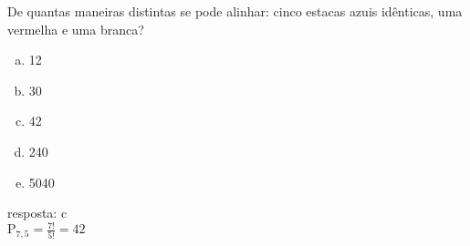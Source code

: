\begin{ex}
 De quantas maneiras distintas se pode alinhar: cinco estacas azuis idênticas, uma vermelha e uma branca?
    \begin{enumerate}[(a)]
    \item 12
    \item 30
    \item 42
    \item 240
    \item 5040
    \end{enumerate}
      \begin{sol}
        resposta: c \\
        $\mathrm{P}_{7,5}=\frac{7!}{5!}=42$
      \end{sol}
\end{ex}
